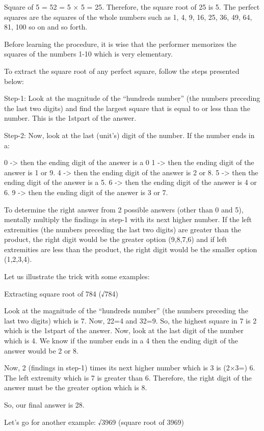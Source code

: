 \documentclass[12pt]{article}
\begin{document}
Square of 5 = 52 = 5 × 5 = 25. Therefore, the square root of 25 is 5. The perfect squares are the squares of the whole numbers such as 1, 4, 9, 16, 25, 36, 49, 64, 81, 100 so on and so forth.

Before learning the procedure, it is wise that the performer memorizes the squares of the numbers 1-10 which is very elementary.

To extract the square root of any perfect square, follow the steps presented below:

Step-1:  Look at the magnitude of the “hundreds number” (the numbers preceding the last two digits) and find the largest square that is equal to or less than the number. This is the 1stpart of the answer.

Step-2:  Now, look at the last (unit’s) digit of the number. If the number ends in a:

0 -> then the ending digit of the answer is a 0
1 -> then the ending digit of the answer is 1 or 9.
4 -> then the ending digit of the answer is 2 or 8.
5 -> then the ending digit of the answer is a 5.
6 -> then the ending digit of the answer is 4 or 6.
9 -> then the ending digit of the answer is 3 or 7.

To determine the right answer from 2 possible answers (other than 0 and 5), mentally multiply the findings in step-1 with its next higher number. If the left extremities (the numbers preceding the last two digits) are greater than the product, the right digit would be the greater option (9,8,7,6) and if left extremities are less than the product, the right digit would be the smaller option (1,2,3,4).

Let us illustrate the trick with some examples:

Extracting square root of 784 (√784)

    Look at the magnitude of the “hundreds number” (the numbers preceding the last two digits) which is 7. Now, 22=4 and 32=9. So, the highest square in 7 is 2 which is the 1stpart of the answer.
    Now, look at the last digit of the number which is 4. We know if the number ends in a 4 then the ending digit of the answer would be 2 or 8.

Now, 2 (findings in step-1) times its next higher number which is 3 is (2×3=) 6. The left extremity which is 7 is greater than 6. Therefore, the right digit of the answer must be the greater option which is 8. 

So, our final answer is 28.

Let’s go for another example: √3969 (square root of 3969)
\end{document}
